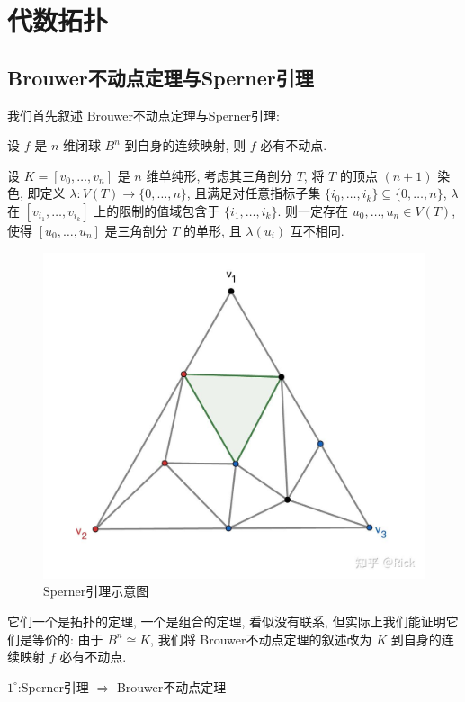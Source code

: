 \chapter{代数拓扑}
    \section{Brouwer不动点定理与Sperner引理}
    我们首先叙述 Brouwer不动点定理与Sperner引理:
    \begin{theorem}[Brouwer不动点定理]
        设 $f$ 是 $n$ 维闭球 $B^n$ 到自身的连续映射, 则 $f$ 必有不动点.
    \end{theorem}
    \begin{lemma}[Sperner引理]
        设 $K=[v_0,\dots,v_n]$ 是 $n$ 维单纯形, 考虑其三角剖分 $T$, 将 $T$ 的顶点 $(n+1)$ 染色, 即定义 $\lambda:V(T)\rightarrow\{0,\dots,n\}$, 且满足对任意指标子集
        $\{i_0,\dots,i_k\}\subseteq\{0,\dots,n\}$, $\lambda$ 在 $[v_{i_1},\dots,v_{i_k}]$ 上的限制的值域包含于 $\{i_1,\dots,i_k\}$. 则一定存在 $u_0,\dots,u_n\in V(T)$, 
        使得 $[u_0,\dots,u_n]$ 是三角剖分 $T$ 的单形, 且 $\lambda(u_i)$ 互不相同.
        \begin{figure}[hbtp]
            \centering
            \includegraphics[scale=0.2]{Figures/SpernerLemma.jpg}
            \caption[SpernerLemma]{Sperner引理示意图}
        \end{figure}
    \end{lemma}

    它们一个是拓扑的定理, 一个是组合的定理, 看似没有联系, 但实际上我们能证明它们是等价的: 由于 $B^n\cong K$, 我们将 Brouwer不动点定理的叙述改为 $K$ 到自身的连续映射 $f$ 必有不动点.

    $1^{\circ}$:Sperner引理 $\Rightarrow$ Brouwer不动点定理

    
